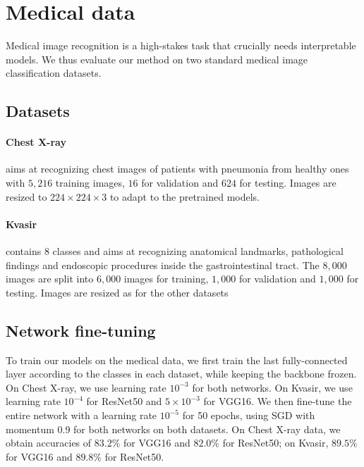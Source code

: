 

\section{Medical data}
\label{sec:medical}

Medical image recognition is a high-stakes task that crucially needs interpretable models. We thus evaluate our method on two standard medical image classification datasets.

\subsection{Datasets}

\paragraph{Chest X-ray}

\citep{kermany2018labeled} aims at recognizing chest images of patients with pneumonia from healthy ones with $5,216$ training images, $16$ for validation and $624$ for testing. Images are resized to $224 \times 224 \times 3$ to adapt to the pretrained models.

\paragraph{Kvasir}

\citep{pogorelov2017kvasir} contains $8$ classes and aims at recognizing anatomical landmarks, pathological findings and endoscopic procedures inside the gastrointestinal tract. The $8,000$ images are split into $6,000$ images for training, $1,000$ for validation and $1,000$ for testing. Images are resized as for the other datasets

\subsection{Network fine-tuning}

To train our models on the medical data, we first train the last fully-connected layer according to the classes in each dataset, while keeping the backbone frozen. On Chest X-ray, we use learning rate  $10^{-3}$ for both networks. On Kvasir, we use learning rate $10^{-4}$ for ResNet50 and $5\times10^{-3}$ for VGG16. We then fine-tune the entire network with a learning rate $10^{-5}$ for 50 epochs, using SGD with momentum 0.9 for both networks on both datasets. On Chest X-ray data, we obtain accuracies of $83.2\%$ for VGG16 and $82.0\%$ for ResNet50; on Kvasir, $89.5\%$ for VGG16 and $89.8\%$ for ResNet50.

